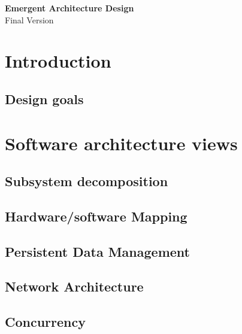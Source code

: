 \documentclass{article}
\begin{document}
\begin{minipage}[H]{\textwidth}
\vspace{0.3cm}
		\begin{center}
		  \vspace{0.3cm}
		  \Huge{\textbf{Emergent Architecture Design}}\\
		  \huge{Final Version}
	      \vspace{0.3cm}	
   		  \vspace{0.7cm}	
		\end{center}
	\end{minipage}
\tableofcontents
\newpage
	\section{Introduction}
	
	 \subsection{Design goals}
	 
	 \section{Software architecture views}
	 \subsection{Subsystem decomposition} 
	 
	 \newpage
	 \subsection{Hardware/software Mapping} 
	 
	\subsection{Persistent Data Management}
	
	\subsection{Network Architecture}
	
	 \subsection{Concurrency} 
	 
\end{document}
